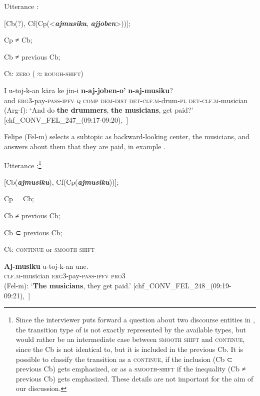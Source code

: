 \documentclass[output=paper
,modfonts
,nonflat]{langsci/langscibook}
\begin{document}
\ea
Utterance :

[Cb(?), Cf(Cp(<\textbf{\textit{ajmusiku}}, \textbf{\textit{ajjoben}}>))];

Cp ≠ Cb;

Cb ≠ previous Cb;

Ct: \textsc{zero ($\approx$rough-shift)}
\z


\ea
\label{ex:pico:39}

\gll I u-toj-k-an kära ke jin-i \textbf{n-aj-joben-o'} \textbf{n-aj-musiku}?\\
and {\textsc{erg3}}-pay-\textsc{pass}-{\textsc{ipfv}} {\textsc{q}} \textsc{comp} \textsc{dem}-\textsc{dist} \textsc{det}-\textsc{clf.m}-drum-\textsc{pl} \textsc{det}-\textsc{clf.m}-musician \\
\glt (Arg-f): `And do \textbf{the drummers}, \textbf{the musicians}, get paid?' [chf\_CONV\_FEL\_247\_(09:17-09:20),~\citealt{Delgado-Galvan2018archive}]
\z

Felipe (Fel-m) selects a subtopic as backward-looking center, the musicians, and answers about them that they are paid, in example .

\ea
Utterance :\footnote{Since the interviewer puts forward a question about two discourse entities in , the transition type of  is not exactly represented by the available types, but would rather be an intermediate case between \textsc{smooth shift} and \textsc{continue}, since the Cb is not identical to, but it is included in the previous Cb. It is possible to classify the transition as a \textsc{continue}, if the inclusion (Cb ⊂ previous Cb) gets emphasized, or as a \textsc{smooth-shift} if the inequality (Cb ≠ previous Cb) gets emphasized. These details are not important for the aim of our discussion.}

[Cb(\textbf{\textit{ajmusiku}}), Cf(Cp(\textbf{\textit{ajmusiku}}))];

Cp = Cb;

Cb ≠ previous Cb;

Cb ⊂ previous Cb;

Ct: \textsc{continue} or \textsc{smooth shift}
\z



\ea{}
\label{ex:pico:41}

\gll \textbf{Aj-musiku} u-toj-k-an une.\\
{\textsc{clf.m}}-musician {\textsc{erg3}}-pay-{\textsc{pass}}-{\textsc{ipfv}} {\textsc{pro3}}\\
\glt (Fel-m): `\textbf{The musicians}, they get paid.' [chf\_CONV\_FEL\_248\_(09:19-09:21),~\citealt{Delgado-Galvan2018archive}]
\z
\end{document}
